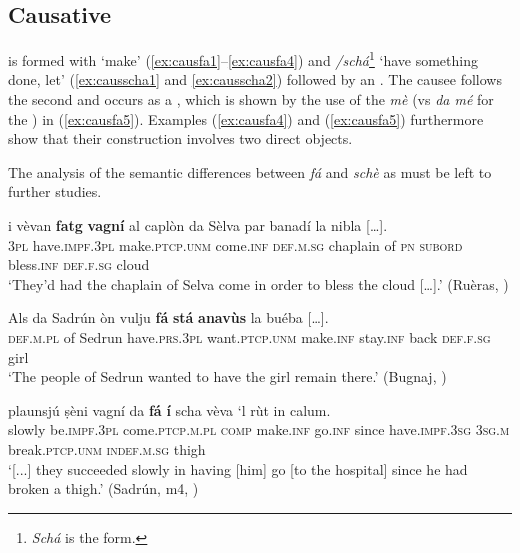 \subsection{Causative}\label{sec:5.5.3}
 is formed with  ‘make’ (\ref{ex:causfa1}--\ref{ex:causfa4}) and \textit{/schá}\footnote{\textit{Schá} is the  form.} `have something done, let' (\ref{ex:causscha1} and \ref{ex:causscha2}) followed by an . The causee follows the second  and occurs as a , which is shown by the use of the  \textit{mè} (vs\textit{ da mé} for the ) in (\ref{ex:causfa5}). Examples (\ref{ex:causfa4}) and (\ref{ex:causfa5}) furthermore show that their construction involves two direct objects.

The analysis of the semantic differences between \textit{fá} and \textit{schè} as  must be left to further studies.

\ea
\label{ex:causfa1}
\gll    […] i vèvan \textbf{fatg} \textbf{vagní} al caplòn da Sèlva par banadí la nibla […].\\
{}   \textsc{3pl} have.\textsc{impf.3pl} make.\textsc{ptcp.unm} come.\textsc{inf} \textsc{def.m.sg} chaplain of \textsc{pn} \textsc{subord} bless.\textsc{inf} \textsc{def.f.sg} cloud\\
\glt `They’d had the chaplain of Selva come in order to bless the cloud […].' (Ruèras, \citealt[62]{Büchli1966})
\z

\ea
\label{ex:causfa2}
\gll     Als da Sadrún òn vulju \textbf{fá} \textbf{stá} \textbf{anavùs} la buéba […].\\
\textsc{def.m.pl} of Sedrun have.\textsc{prs.3pl} want.\textsc{ptcp.unm} make.\textsc{inf} stay.\textsc{inf} back \textsc{def.f.sg} girl\\
\glt `The people of Sedrun wanted to have the girl remain there.' (Bugnaj, \citealt[131]{Büchli1966})
\z


\ea\label{ex:causfa3}
\gll   [...] plaunsjú ṣèni vagní da \textbf{fá} \textbf{í} scha vèva `l rùt in calum.\\
{} slowly be.\textsc{impf.3pl} come.\textsc{ptcp.m.pl} \textsc{comp} make.\textsc{inf} go.\textsc{inf} since have.\textsc{impf.3sg} \textsc{3sg.m} break.\textsc{ptcp.unm} \textsc{indef.m.sg} thigh \\
\glt `[...] they succeeded slowly in having [him] go [to the hospital] since he had broken a thigh.' (Sadrún, m4, )
\z

